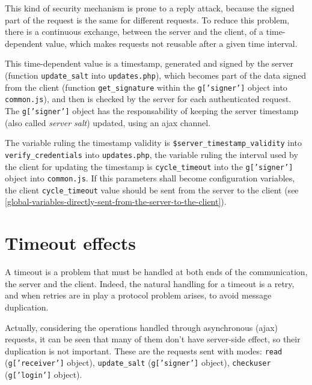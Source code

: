 \documentclass[10pt,a4paper,english]{book}
\begin{document}
This kind of security mechanism is prone to a reply attack, because
the signed part of the request is the same for different requests. To
reduce this problem, there is a continuous exchange, between the
server and the client, of a time-dependent value, which makes requests
not reusable after a given time interval.

This time-dependent value is a timestamp, generated and signed by the
server (function \texttt{update{\_}salt} into \texttt{updates.php}), which becomes
part of the data signed from the client (function \texttt{get{\_}signature}
within the \texttt{g{[}'signer'{]}} object into \texttt{common.js}), and then is
checked by the server for each authenticated request. The
\texttt{g{[}'signer'{]}} object has the responsability of keeping the server
timestamp (also called \emph{server salt}) updated, using an ajax channel.

The variable ruling the timestamp validity is
\texttt{{\$}server{\_}timestamp{\_}validity} into \texttt{verify{\_}credentials} into
\texttt{updates.php}, the variable ruling the interval used by the client
for updating the timestamp is \texttt{cycle{\_}timeout} into the
\texttt{g{[}'signer'{]}} object into \texttt{common.js}. If this parameters shall
become configuration variables, the client \texttt{cycle{\_}timeout} value
should be sent from the server to the client (see \href{\#global-variables-directly-sent-from-the-server-to-the-client}{\ref*{global-variables-directly-sent-from-the-server-to-the-client}}).



\hypertarget{timeout-effects}{}
\section{Timeout effects}
\label{timeout-effects}

A timeout is a problem that must be handled at both ends of the
communication, the server and the client. Indeed, the natural handling
for a timeout is a retry, and when retries are in play a protocol
problem arises, to avoid message duplication.

Actually, considering the operations handled through asynchronous
(ajax) requests, it can be seen that many of them don't have
server-side effect, so their duplication is not important. These are
the requests sent with modes: \texttt{read} (\texttt{g{[}'receiver'{]}} object),
\texttt{update{\_}salt} (\texttt{g{[}'signer'{]}} object), \texttt{checkuser}
(\texttt{g{[}'login'{]}} object).
\end{document}

